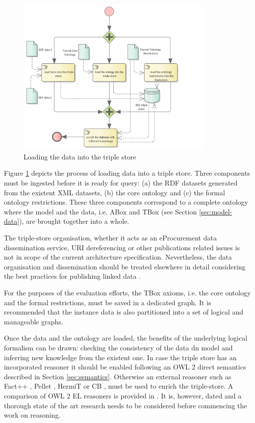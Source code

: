 	\begin{figure}[!ht]		
		\centering
		\includegraphics[width=0.86\textwidth]{../img/loading-data.png}
		\caption{Loading the data into the triple store}
		\label{fig:loading-date}
	\end{figure}

	Figure \ref{fig:loading-date} depicts the process of loading data into a triple store. Three components must be ingested before it is ready for query: (a) the RDF datasets generated from the existent XML datasets, (b) the core ontology and (c) the formal ontology restrictions. These three components correspond to a complete ontology where the model and the data, i.e. ABox and TBox (see Section \ref{sec:model-data}), are brought together into a whole.
	
	The triple-store organisation, whether it acts as an eProcurement data dissemination service, URI dereferencing or other publications related issues is not in scope of the current architecture specification. Nevertheless, the data organisation and dissemination should be treated elsewhere in detail considering the best practices for publishing linked data \cite{bizer2009emerging}.
	
	For the purposes of the evaluation efforts, the TBox axioms, i.e. the core ontology and the formal restrictions, must be saved in a dedicated graph.  It is recommended that the instance data is also partitioned into a set of logical and manageable graphs.  

	Once the data and the ontology are loaded, the benefits of the underlying logical formalism can be drawn: checking the consistency of the data dn model and inferring new knowledge from the existent one. In case the triple store has an incorporated reasoner it should be enabled following an OWL 2 direct semantics described in Section \ref{sec:semantics}. Otherwise an external reasoner such as Fact++ \cite{tsarkov2006fact++}, Pellet \cite{sirin2007pellet}, HermiT \cite{shearer2008hermit} or CB \cite{kazakov2009consequence}, must be used to enrich the triple-store. A comparison of OWL 2 EL reasoners is provided in \citep{dentler2011comparison}. It is, however, dated and a thorough state of the art research needs to be considered before commencing the work on reasoning. 
	
